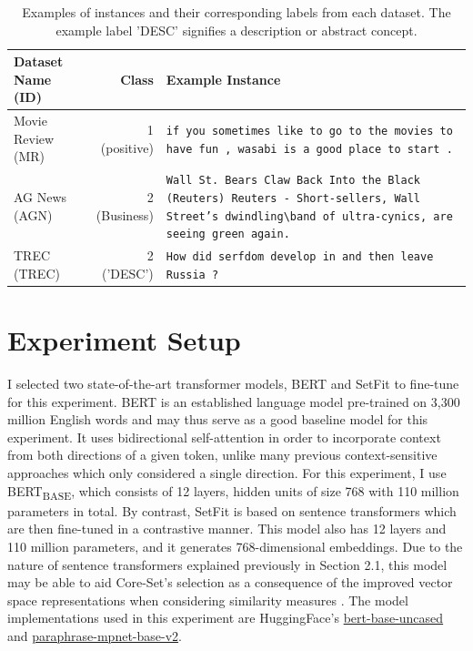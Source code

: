 \documentclass[english,bachelor,ul]{webisthesis} %
\begin{document}
\vspace{1\baselineskip}

\begin{table}[htbp]
    \centering
    \renewcommand{\arraystretch}{1.5}
    \begin{tabular}{@{}lrp{7cm}@{}} 
        \toprule
        \textbf{Dataset Name} \scriptsize (ID) & \textbf{Class} & \textbf{Example Instance} \\
        \midrule
        Movie Review \scriptsize (MR) & 1 (positive) & \texttt{if you sometimes like to go to the movies to have fun , wasabi is a good place to start .} \\
        AG News \scriptsize (AGN) & 2  (Business) & \texttt{Wall St. Bears Claw Back Into the Black (Reuters) Reuters - Short-sellers, Wall Street's dwindling\textbackslash band of ultra-cynics, are seeing green again.} \\
        TREC \scriptsize (TREC) & 2 ('DESC') & \texttt{How did serfdom develop in and then leave Russia ?} \\
        \bottomrule
    \end{tabular}
    \caption{Examples of instances and their corresponding labels from each dataset. The example label 'DESC' signifies a description or abstract concept.}
    \label{tab:dataset-instances}
\end{table}

\newpage 

\section{Experiment Setup}

I selected two state-of-the-art transformer models, BERT \citep{DBLP:conf/naacl/DevlinCLT19} and SetFit \citep{DBLP:setfit} to fine-tune for this experiment. BERT is an established language model pre-trained on 3,300 million English words and may thus serve as a good baseline model for this experiment. It uses bidirectional self-attention in order to incorporate context from both directions of a given token, unlike many previous context-sensitive approaches which only considered a single direction. For this experiment, I use BERT\textsubscript{BASE}, which consists of 12 layers, hidden units of size 768 with 110 million parameters in total. By contrast, SetFit is based on sentence transformers which are then fine-tuned in a contrastive manner. This model also has 12 layers and 110 million parameters, and it generates 768-dimensional embeddings. Due to the nature of sentence transformers explained previously in Section 2.1, this model may be able to aid Core-Set's selection as a consequence of the improved vector space representations when considering similarity measures \citep{DBLP:conf/emnlp/ReimersG19}. The model implementations used in this experiment are HuggingFace's \href{https://huggingface.co/google-bert/bert-base-uncased}{bert-base-uncased} and \href{https://huggingface.co/sentence-transformers/paraphrase-mpnet-base-v2}{
paraphrase-mpnet-base-v2}.
\end{document}
